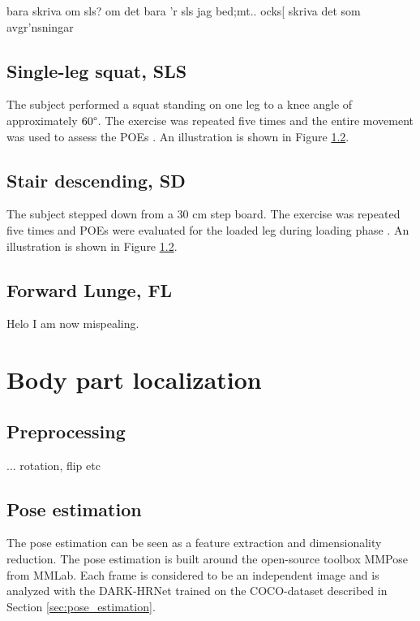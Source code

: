 bara skriva om sls? om det bara 'r sls jag bed;mt.. ocks[ skriva det som avgr'nsningar

\subsection{Single-leg squat, SLS} \label{sec:met-SLS}
The subject performed a squat standing on one leg to a knee angle of approximately $60\degree$. The exercise was repeated five times and the entire movement was used to assess the POEs \cite{Nae2020}. An illustration is shown in Figure \ref{}.

\subsection{Stair descending, SD}
The subject stepped down from a 30 cm step board. The exercise was repeated five times and POEs were evaluated for the loaded leg during loading phase \cite{Nae2020}. An illustration is shown in Figure \ref{}.

\subsection{Forward Lunge, FL}

Helo I am now mispealing.





\section{Body part localization} \label{sec:met-loc}
\subsection{Preprocessing}
...
rotation, flip etc

\subsection{Pose estimation}
The pose estimation can be seen as a feature extraction and dimensionality reduction.
The pose estimation is built around the open-source toolbox MMPose \cite{mmpose} from MMLab. Each frame is considered to be an independent image and is analyzed with the DARK-HRNet trained on the COCO-dataset \cite{Lin2014} described in Section \ref{sec:pose_estimation}. %


